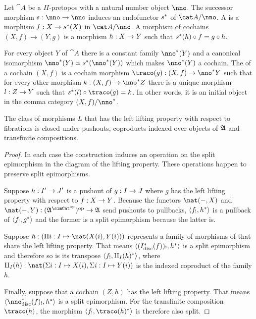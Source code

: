 \documentclass[csh.tex]{subfiles}
\begin{document}
\begin{definition} Let $\cat A$ be a $\Pi$-pretopos with a natural number object $\nno$. The successor morphism $s\of\nno\to\nno$ induces an endofunctor $s^*$ of $\cat A/\nno$. A  is a morphism $f: X\to s^*(X)$ in $\cat A/\nno$. A morphism of cochains $(X,f)\to(Y,g)$ is a morphism $h: X\to Y$ such that $s^*(h)\circ f = g\circ h$.

For every object $Y$ of $\cat A$ there is a constant family $\nno\ri(Y)$ and a canonical isomorphism $\nno\ri(Y)\simeq s\ri(\nno\ri(Y))$ which makes $\nno\ri(Y)$ a cochain. The  of a cochain $(X,f)$ is a cochain morphism $\traco(g)\of (X,f)\to\nno\ri Y$ such that for every other morphism $k\of (X,f)\to\nno\ri Z$ there is a unique morphism $l: Z\to Y$ such that $s\ri(l)\circ \traco(g)=k$. In other words, it is an initial object in the comma category $(X,f)/\nno\ri$.
\end{definition}

\begin{lemma} The class of morphisms $L$ that has the left lifting property with respect to fibrations is closed under pushouts, coproducts indexed over objects of $\mathfrak A$ and transfinite compositions. \label{saturation}\end{lemma}

\begin{proof}
In each case the construction induces an operation on the split epimorphism in the diagram of the lifting property. These operations happen to preserve split epimorphisms.

Suppose $h: I'\to J'$ is a pushout of $g: I\to J$ where $g$ has the left lifting property with respect to $f: X\to Y$. Because the functors $\nat(-,X)$ and $\nat(-,Y)\of(\ambient\s)\dual\to\ambient$ send pushouts to pullbacks, $\left\langle f_!,h^* \right\rangle$ is a pullback of $\left\langle f_!,g^* \right\rangle$ and the former is a split epimorphism because the latter is.

Suppose $h\of(\product{i\of I}{\nat(X(i),Y(i))})$ represents a family of morphisms of that share the left lifting property. That means $\left\langle (I_{\rm disc}^*(f))_!,h^* \right\rangle$ is a split epimorphism and therefore so is its transpose $\left\langle f_!,\amalg_I(h)^* \right\rangle$, where $\amalg_I(h)\of\nat(\coproduct{i\of I}{X(i)},\coproduct{i\of I}{Y(i)})$ is the indexed coproduct of the family $h$.%

Finally, suppose that a cochain $(Z,h)$ has the left lifting property. That means $\tuplet{\nno\disc\ri(f)_!,h\ri}$ is a split epimorphism. For the transfinite composition $\traco(h)$, the morphism $\tuplet{f_!,\traco(h)\ri}$ is therefore also split.
\end{proof}
\end{document}
